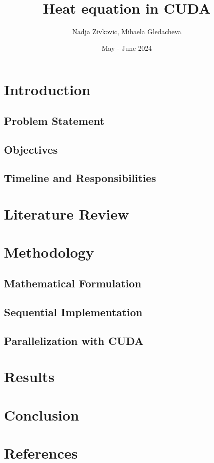 \documentclass{article}
\title{Heat equation in CUDA}
\author{Nadja Zivkovic, Mihaela Gledacheva}
\date{May - June 2024}
\begin{document}
\maketitle

\section{Introduction}
\subsection{Problem Statement}
\subsection{Objectives}
\subsection{Timeline and Responsibilities}

\section{Literature Review}

\section{Methodology}
\subsection{Mathematical Formulation}
\subsection{Sequential Implementation}
\subsection{Parallelization with CUDA}

\section{Results}

\section{Conclusion}

\newpage
\section{References}
\end{document}

